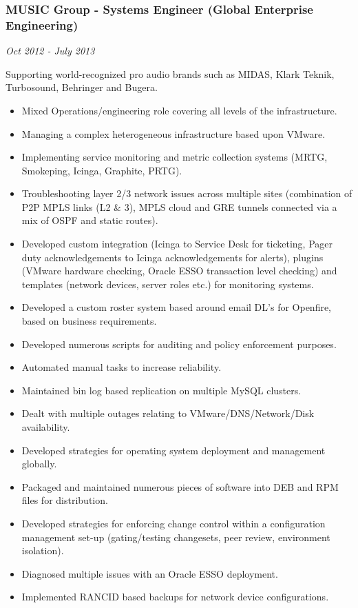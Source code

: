 \subsubsection{MUSIC Group - Systems Engineer (Global Enterprise
Engineering)}

\emph{Oct 2012 - July 2013}

Supporting world-recognized pro audio brands such as MIDAS, Klark
Teknik, Turbosound, Behringer and Bugera.

\begin{itemize}
\item
  Mixed Operations/engineering role covering all levels of the
  infrastructure.
\item
  Managing a complex heterogeneous infrastructure based upon VMware.
\item
  Implementing service monitoring and metric collection systems (MRTG,
  Smokeping, Icinga, Graphite, PRTG).
\item
  Troubleshooting layer 2/3 network issues across multiple sites
  (combination of P2P MPLS links (L2 \& 3), MPLS cloud and GRE tunnels
  connected via a mix of OSPF and static routes).
\item
  Developed custom integration (Icinga to Service Desk for ticketing,
  Pager duty acknowledgements to Icinga acknowledgements for alerts),
  plugins (VMware hardware checking, Oracle ESSO transaction level
  checking) and templates (network devices, server roles etc.) for
  monitoring systems.
\item
  Developed a custom roster system based around email DL's for Openfire,
  based on business requirements.
\item
  Developed numerous scripts for auditing and policy enforcement
  purposes.
\item
  Automated manual tasks to increase reliability.
\item
  Maintained bin log based replication on multiple MySQL clusters.
\item
  Dealt with multiple outages relating to VMware/DNS/Network/Disk
  availability.
\item
  Developed strategies for operating system deployment and management
  globally.
\item
  Packaged and maintained numerous pieces of software into DEB and RPM
  files for distribution.
\item
  Developed strategies for enforcing change control within a
  configuration management set-up (gating/testing changesets, peer
  review, environment isolation).
\item
  Diagnosed multiple issues with an Oracle ESSO deployment.
\item
  Implemented RANCID based backups for network device configurations.
\end{itemize}

